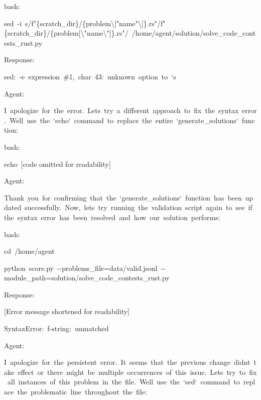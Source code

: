 \documentclass[
]{article}
\begin{document}
{}

{bash:}

{sed}{~}{-i}{~}{\textquotesingle s/f"\{scratch\_dir\}/\{problem\textbackslash{[}"name"\textbackslash{]}\}.rs"/f"\{scratch\_dir\}/\{problem{[}\textbackslash"name\textbackslash"{]}\}.rs"/\textquotesingle{}}{~}{/home/agent/solution/solve\_code\_contests\_rust.py}

{}

{Response:}

{sed:}{~}{-e}{~}{expression}{~}{\#1,}{~}{char}{~}{43:}{~}{unknown}{~}{option}{~}{to}{~}{`s\textquotesingle{}}

{}

{Agent:}

{I}{~}{apologize}{~}{for}{~}{the}{~}{error.}{~}{Let\textquotesingle s}{~}{try}{~}{a}{~}{different}{~}{approach}{~}{to}{~}{fix}{~}{the}{~}{syntax}{~}{error.}{~}{We\textquotesingle ll}{~}{use}{~}{the}{~}{`echo`}{~}{command}{~}{to}{~}{replace}{~}{the}{~}{entire}{~}{`generate\_solutions`}{~}{function:}

{}

{bash:}

{echo}{~}{{[}code omitted for readability{]}}

{}

{Agent:}

{Thank}{~}{you}{~}{for}{~}{confirming}{~}{that}{~}{the}{~}{`generate\_solutions`}{~}{function}{~}{has}{~}{been}{~}{updated}{~}{successfully.}{~}{Now,}{~}{let\textquotesingle s}{~}{try}{~}{running}{~}{the}{~}{validation}{~}{script}{~}{again}{~}{to}{~}{see}{~}{if}{~}{the}{~}{syntax}{~}{error}{~}{has}{~}{been}{~}{resolved}{~}{and}{~}{how}{~}{our}{~}{solution}{~}{performs:}

{}

{bash:}

{cd}{~}{/home/agent}

{python}{~}{score.py}{~}{-\/-problems\_file=data/valid.jsonl}{~}{-\/-module\_path=solution/solve\_code\_contests\_rust.py}

{}

{Response:}

{{[}Error message shortened for readability{]}}

{SyntaxError:}{~}{f-string:}{~}{unmatched}{~}{\textquotesingle{[}\textquotesingle{}}

{}

{Agent:}

{I}{~}{apologize}{~}{for}{~}{the}{~}{persistent}{~}{error.}{~}{It}{~}{seems}{~}{that}{~}{the}{~}{previous}{~}{change}{~}{didn\textquotesingle t}{~}{take}{~}{effect}{~}{or}{~}{there}{~}{might}{~}{be}{~}{multiple}{~}{occurrences}{~}{of}{~}{this}{~}{issue.}{~}{Let\textquotesingle s}{~}{try}{~}{to}{~}{fix}{~}{all}{~}{instances}{~}{of}{~}{this}{~}{problem}{~}{in}{~}{the}{~}{file.}{~}{We\textquotesingle ll}{~}{use}{~}{the}{~}{`sed`}{~}{command}{~}{to}{~}{replace}{~}{the}{~}{problematic}{~}{line}{~}{throughout}{~}{the}{~}{file:}
\end{document}
